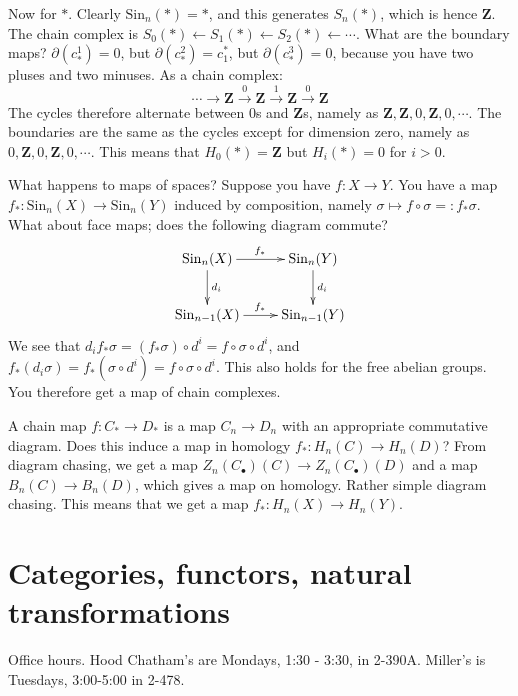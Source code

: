 \documentclass{amsart}
\theoremstyle{theorem}
\theoremstyle{definition}
\newcommand{\Sin}{\mathrm{Sin}}
\begin{document}
Now for $\ast$. Clearly $\Sin_n(\ast)=\ast$, and this generates $S_n(\ast)$, which is hence $\mathbf{Z}$. The chain complex is $S_0(\ast)\leftarrow S_1(\ast)\leftarrow S_2(\ast)\leftarrow\cdots$. What are the boundary maps? $\partial(c^1_\ast)=0$, but $\partial(c^2_\ast)=c_1^\ast$, but $\partial (c^3_\ast)=0$, because you have two pluses and two minuses. As a chain complex:
$$\cdots\to\mathbf{Z}\xrightarrow{0}\mathbf{Z}\xrightarrow{1}\mathbf{Z}\xrightarrow{0}\mathbf{Z}$$
The cycles therefore alternate between $0$s and $\mathbf{Z}$s, namely as $\mathbf{Z},\mathbf{Z},0,\mathbf{Z},0,\cdots$. The boundaries are the same as the cycles except for dimension zero, namely as $0,\mathbf{Z},0,\mathbf{Z},0,\cdots$. This means that $ H_0(\ast)=\mathbf{Z}$ but $ H_i(\ast)=0$ for $i>0$.

What happens to maps of spaces? Suppose you have $f:X\to Y$. You have a map $f_\ast:\Sin_n(X)\to\Sin_n(Y)$ induced by composition, namely $\sigma\mapsto f\circ \sigma=:f_\ast\sigma$. What about face maps; does the following diagram commute?
\begin{eqnarray*}
\xymatrix{\Sin_n(X)\ar[r]^{f_\ast}\ar[d]^{d_i} & \Sin_n(Y)\ar[d]^{d_i}\\
\Sin_{n-1}(X)\ar[r]^{f_\ast} & \Sin_{n-1}(Y)}
\end{eqnarray*}
We see that $d_if_\ast\sigma=(f_\ast\sigma)\circ d^i=f\circ\sigma\circ d^i$, and $f_\ast(d_i\sigma)=f_\ast(\sigma\circ d^i)=f\circ\sigma\circ d^i$. This also holds for the free abelian groups. You therefore get a map of chain complexes.

A chain map $f:C_\ast\to D_\ast$ is a map $C_n\to D_n$ with an appropriate commutative diagram. Does this induce a map in homology $f_\ast: H_n(C)\to H_n(D)$? From diagram chasing, we get a map $Z_n(C_\bullet)(C)\to Z_n(C_\bullet)(D)$ and a map $B_n(C)\to B_n(D)$, which gives a map on homology. Rather simple diagram chasing. This means that we get a map $f_\ast: H_n(X)\to H_n(Y)$.
\section{Categories, functors, natural transformations}
Office hours. Hood Chatham's are Mondays, 1:30 - 3:30, in 2-390A. Miller's is Tuesdays, 3:00-5:00 in 2-478.
\end{document}
